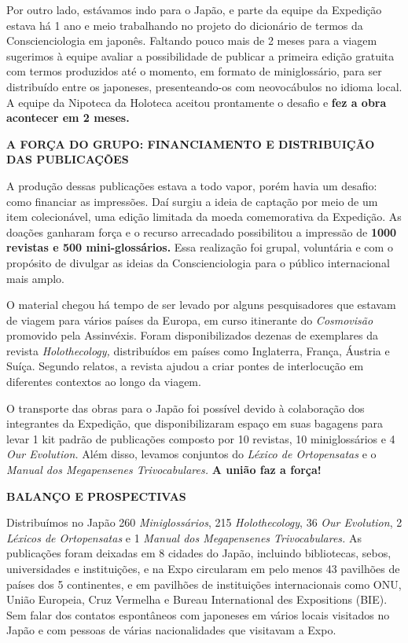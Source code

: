 Por outro lado, estávamos indo para o Japão, e parte da equipe da Expedição estava há 1 ano e meio trabalhando no projeto do dicionário de termos da Conscienciologia em japonês. Faltando pouco mais de 2 meses para a viagem sugerimos à equipe avaliar a possibilidade de publicar a primeira edição gratuita com termos produzidos até o momento, em formato de miniglossário, para ser distribuído entre os japoneses, presenteando-os com neovocábulos no idioma local. A equipe da Nipoteca da Holoteca aceitou prontamente o desafio e \textbf{fez a obra acontecer em 2 meses.}

\textbf{A FORÇA DO GRUPO: FINANCIAMENTO E DISTRIBUIÇÃO DAS PUBLICAÇÕES}

A produção dessas publicações estava a todo vapor, porém havia um desafio: como financiar as impressões. Daí surgiu a ideia de captação por meio de um item colecionável, uma edição limitada da moeda comemorativa da Expedição. As doações ganharam força e o recurso arrecadado possibilitou a impressão de \textbf{1000 revistas e 500 mini-glossários.} Essa realização foi grupal, voluntária e com o propósito de divulgar as ideias da Conscienciologia para o público internacional mais amplo.

O material chegou há tempo de ser levado por alguns pesquisadores que estavam de viagem para vários países da Europa, em curso itinerante do \emph{Cosmovisão} promovido pela Assinvéxis. Foram disponibilizados dezenas de exemplares da revista \emph{Holothecology,} distribuídos em países como Inglaterra, França, Áustria e Suíça. Segundo relatos, a revista ajudou a criar pontes de interlocução em diferentes contextos ao longo da viagem.

O transporte das obras para o Japão foi possível devido à colaboração dos integrantes da Expedição, que disponibilizaram espaço em suas bagagens para levar 1 kit padrão de publicações composto por 10 revistas, 10 miniglossários e 4 \emph{Our Evolution.} Além disso, levamos conjuntos do \emph{Léxico de Ortopensatas} e o \emph{Manual dos Megapensenes Trivocabulares.} \textbf{A união faz a força!}

\textbf{BALANÇO E PROSPECTIVAS}

Distribuímos no Japão 260 \emph{Miniglossários}, 215 \emph{Holothecology}, 36 \emph{Our Evolution}, 2 \emph{Léxicos de Ortopensatas} e 1 \emph{Manual dos Megapensenes Trivocabulares.} As publicações foram deixadas em 8 cidades do Japão, incluindo bibliotecas, sebos, universidades e instituições, e na Expo circularam em pelo menos 43 pavilhões de países dos 5 continentes, e em pavilhões de instituições internacionais como ONU, União Europeia, Cruz Vermelha e Bureau International des Expositions (BIE). Sem falar dos contatos espontâneos com japoneses em vários locais visitados no Japão e com pessoas de várias nacionalidades que visitavam a Expo.

